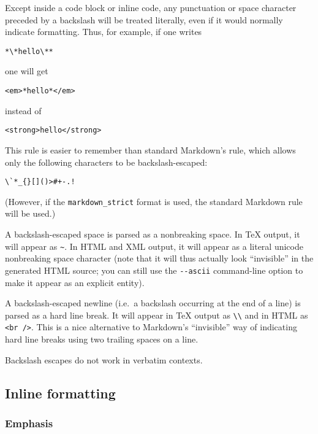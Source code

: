 \documentclass[]{article}
\begin{document}
Except inside a code block or inline code, any punctuation or space
character preceded by a backslash will be treated literally, even if it
would normally indicate formatting. Thus, for example, if one writes

\begin{verbatim}
*\*hello\**
\end{verbatim}

one will get

\begin{verbatim}
<em>*hello*</em>
\end{verbatim}

instead of

\begin{verbatim}
<strong>hello</strong>
\end{verbatim}

This rule is easier to remember than standard Markdown's rule, which
allows only the following characters to be backslash-escaped:

\begin{verbatim}
\`*_{}[]()>#+-.!
\end{verbatim}

(However, if the \texttt{markdown\_strict} format is used, the standard
Markdown rule will be used.)

A backslash-escaped space is parsed as a nonbreaking space. In TeX
output, it will appear as \texttt{\textasciitilde{}}. In HTML and XML
output, it will appear as a literal unicode nonbreaking space character
(note that it will thus actually look ``invisible'' in the generated
HTML source; you can still use the \texttt{-\/-ascii} command-line
option to make it appear as an explicit entity).

A backslash-escaped newline (i.e.~a backslash occurring at the end of a
line) is parsed as a hard line break. It will appear in TeX output as
\texttt{\textbackslash{}\textbackslash{}} and in HTML as
\texttt{\textless{}br\ /\textgreater{}}. This is a nice alternative to
Markdown's ``invisible'' way of indicating hard line breaks using two
trailing spaces on a line.

Backslash escapes do not work in verbatim contexts.

\hypertarget{inline-formatting}{%
\subsection{Inline formatting}\label{inline-formatting}}

\hypertarget{emphasis}{%
\subsubsection{Emphasis}\label{emphasis}}
\end{document}
